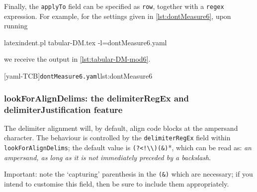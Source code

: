 \documentclass[10pt]{article}
\begin{document}
 \begin{example}
 Finally, the \texttt{applyTo} field can be specified as \texttt{row}, together with a
 \texttt{regex} expression. For example, for the settings given in
 \cref{lst:dontMeasure6}, upon running 

 \begin{commandshell} 
latexindent.pl tabular-DM.tex -l=dontMeasure6.yaml
\end{commandshell}

 we receive the output in \cref{lst:tabular-DM-mod6}.  

 \begin{cmhtcbraster}
  [yaml-TCB]{\texttt{dontMeasure6.yaml}}{lst:dontMeasure6}
 \end{cmhtcbraster}
 \end{example}

\subsubsection{lookForAlignDelims: the delimiterRegEx and delimiterJustification feature}\label{sec:delimiter-reg-ex}

 The delimiter alignment  will, by default,
 align code blocks at the ampersand character. The behaviour is controlled by the
 \texttt{delimiterRegEx} field within \texttt{lookForAlignDelims}; the default value is
 \lstinline*'(?<!\\)(&)'*, which can be read as: \emph{an ampersand, as long as it is not
 immediately preceded by a backslash}.    

 \begin{warning}
  Important: note the `capturing' parenthesis in the \lstinline!(&)! which are necessary;
  if you intend to customise this field, then be sure to include them appropriately.
 \end{warning}
\end{document}
